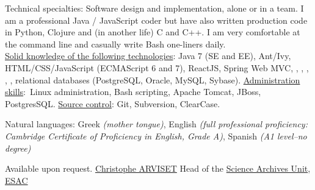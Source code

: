 \documentclass[10pt,a4paper]{article} %
\begin{document}
\spacedhrule{0.5em}{-0.4em} %



\inlineheadsection %
{Technical specialties:}
{Software design and implementation, alone or in a team. I am a professional Java / JavaScript coder but 
  have also written production code in Python, Clojure and (in another life) C and C++.
  I am very comfortable
  at the command line and casually write Bash one-liners daily.\\
  \underline{Solid knowledge of the following technologies}: Java 7 (SE and EE), Ant/Ivy, HTML/CSS/JavaScript (ECMAScript 6 and 7), ReactJS, Spring Web MVC,
  , , , , , relational databases (PostgreSQL, Oracle, MySQL, Sybase).
  \underline{Administration skills}:\ Linux administration, Bash scripting, Apache Tomcat, JBoss, PostgresSQL.
  \underline{Source control}:  Git, Subversion, ClearCase.
}

\inlineheadsection{}{}

\inlineheadsection %
{Natural languages:}
{Greek \textit{(mother tongue)}, English \textit{(full professional proficiency: Cambridge Certificate of Proficiency in English, Grade A)}, Spanish \textit{(A1 level--no degree)}}

\spacedhrule{1.6em}{-0.4em} %


Available upon request.
\iffalse
  \inlineheadsection
      {\href{mailto:Christophe.Arviset@esa.int}{Christophe ARVISET}}
      {Head of the \href{http://www.cosmos.esa.int/web/esdc}{Science Archives Unit}, \href{http://www.esa.int/About\_Us/ESACESAC}{ESAC}}

      \inlineheadsection{}{}
\end{document}
